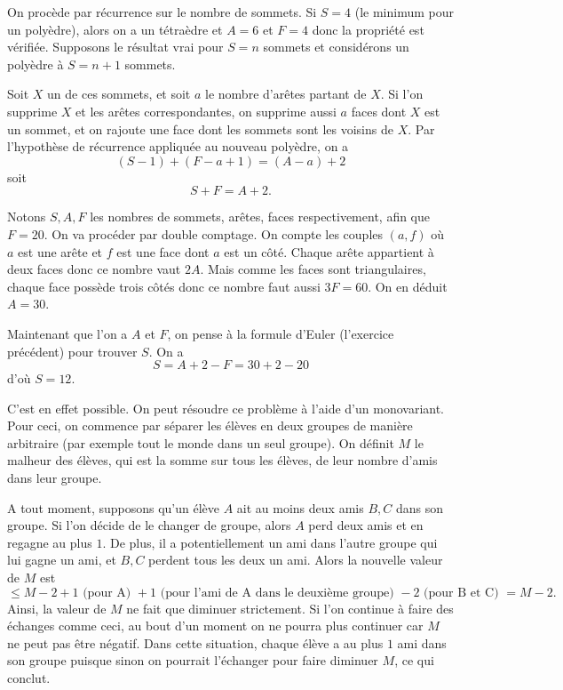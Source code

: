 \begin{sol}
On procède par récurrence sur le nombre de sommets. Si $S=4$ (le minimum pour un polyèdre), alors on a un tétraèdre et $A=6$ et $F=4$ donc la propriété est vérifiée. Supposons le résultat vrai pour $S=n$ sommets et considérons un polyèdre à $S=n+1$ sommets.

Soit $X$ un de ces sommets, et soit $a$ le nombre d'arêtes partant de $X$. Si l'on supprime $X$ et les arêtes correspondantes, on supprime aussi $a$ faces dont $X$ est un sommet, et on rajoute une face dont les sommets sont les voisins de $X$. Par l'hypothèse de récurrence appliquée au nouveau polyèdre, on a 
$$(S-1)+(F-a+1) = (A-a)+2$$
soit
$$S+F=A+2.$$
\end{sol}

\begin{sol}
Notons $S,A,F$ les nombres de sommets, arêtes, faces respectivement, afin que $F=20$. On va procéder par double comptage. On compte les couples $(a,f)$ où $a$ est une arête et $f$ est une face dont $a$ est un côté. Chaque arête appartient à deux faces donc ce nombre vaut $2A$. Mais comme les faces sont triangulaires, chaque face possède trois côtés donc ce nombre faut aussi $3F=60$. On en déduit $A=30$.

Maintenant que l'on a $A$ et $F$, on pense à la formule d'Euler (l'exercice précédent) pour trouver $S$. On a
$$S=A+2-F=30+2-20$$
d'où $S=12$.
\end{sol}

\begin{sol}
C'est en effet possible. On peut résoudre ce problème à l'aide d'un monovariant. Pour ceci, on commence par séparer les élèves en deux groupes de manière arbitraire (par exemple tout le monde dans un seul groupe). On définit $M$ le malheur des élèves, qui est la somme sur tous les élèves, de leur nombre d'amis dans leur groupe. 

A tout moment, supposons qu'un élève $A$ ait au moins deux amis $B,C$ dans son groupe. Si l'on décide de le changer de groupe, alors $A$ perd deux amis et en regagne au plus $1$. De plus, il a potentiellement un ami dans l'autre groupe qui lui gagne un ami, et $B,C$ perdent tous les deux un ami. Alors la nouvelle valeur de $M$ est
$$\le M -2+1\text{ (pour A) }+1\text{ (pour l'ami de A dans le deuxième groupe) }-2\text{ (pour B et C) }=M-2.$$
Ainsi, la valeur de $M$ ne fait que diminuer strictement. Si l'on continue à faire des échanges comme ceci, au bout d'un moment on ne pourra plus continuer car $M$ ne peut pas être négatif. Dans cette situation, chaque élève a au plus $1$ ami dans son groupe puisque sinon on pourrait l'échanger pour faire diminuer $M$, ce qui conclut.
\end{sol}

